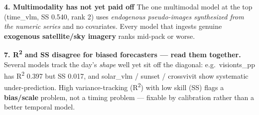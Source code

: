 \documentclass[
  9pt,
]{article}
\begin{document}
\textbf{4. Multimodality has not yet paid off} The one multimodal model
at the top (time\_\allowbreak{}vlm, SS 0.540, rank 2) uses \emph{endogenous
pseudo-images synthesized from the numeric series} and no covariates.
Every model that ingests genuine \textbf{exogenous satellite/sky
imagery} ranks mid-pack or worse.

\textbf{7. R\textsuperscript{2} and SS disagree for biased forecasters --- read them
together.} Several models track the day's \emph{shape} well yet sit off
the diagonal: e.g.~visionts\_\allowbreak{}pp has R\textsuperscript{2} 0.397 but SS 0.017, and
solar\_\allowbreak{}vlm / sunset / crossvivit show systematic under-prediction. High
variance-tracking (R\textsuperscript{2}) with low skill (SS) flags a \textbf{bias/scale}
problem, not a timing problem --- fixable by calibration rather than a
better temporal model.
\end{document}
